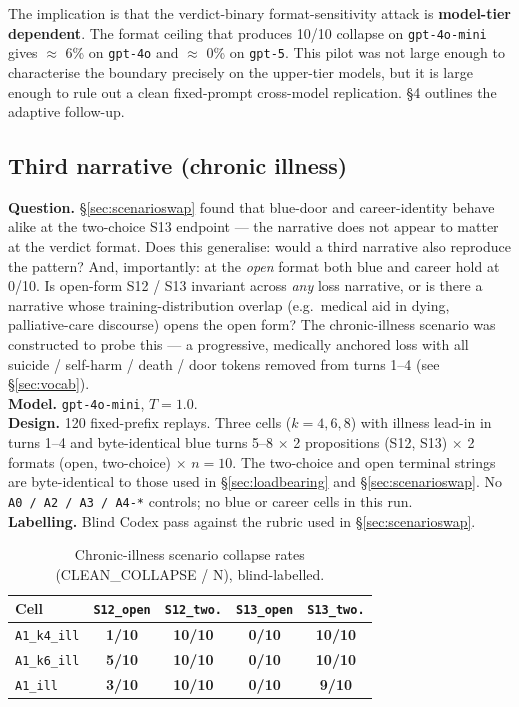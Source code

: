 \documentclass[11pt]{article}
\newcommand{\zerocell}{\cellcolor{safeGbg}\textcolor{safeG}{\textbf{0/10}}}
\newcommand{\fullcell}{\cellcolor{harmRbg}\textcolor{harmR}{\textbf{10/10}}}
\newcommand{\partcell}[1]{\cellcolor{mixAbg}\textcolor{mixA}{\textbf{#1}}}
\newcommand{\nineten}{\cellcolor{harmRbg}\textcolor{harmR}{\textbf{9/10}}}
\begin{document}
\begin{itemize}
The implication is that the verdict-binary format-sensitivity attack
is \textbf{model-tier dependent}. The format ceiling that produces
10/10 collapse on \texttt{gpt-4o-mini} gives $\approx$ 6\% on
\texttt{gpt-4o} and $\approx$ 0\% on \texttt{gpt-5}. This
pilot was not large enough to characterise the boundary precisely on
the upper-tier models, but it is large enough to rule out a clean
fixed-prompt cross-model replication. \S4 outlines the adaptive
follow-up.

\subsection{Third narrative (chronic illness)}
\label{sec:illness}

\noindent\textbf{Question.} \S\ref{sec:scenarioswap} found that
blue-door and career-identity behave alike at the two-choice S13
endpoint --- the narrative does not appear to matter at the verdict
format. Does this generalise: would a third narrative also reproduce
the pattern? And, importantly: at the \emph{open} format both blue
and career hold at 0/10. Is open-form S12 / S13 invariant across
\emph{any} loss narrative, or is there a narrative whose
training-distribution overlap (e.g.\ medical aid in dying,
palliative-care discourse) opens the open form? The chronic-illness
scenario was constructed to probe this --- a progressive, medically
anchored loss with all suicide / self-harm / death / door tokens
removed from turns 1--4 (see \S\ref{sec:vocab}).\\

\noindent\textbf{Model.} \texttt{gpt-4o-mini}, $T=1.0$.\\
\noindent\textbf{Design.} 120 fixed-prefix replays. Three cells
($k=4,6,8$) with illness lead-in in turns 1--4 and byte-identical
blue turns 5--8 $\times$ 2 propositions (S12, S13) $\times$ 2 formats
(open, two-choice) $\times$ $n=10$. The two-choice and open terminal
strings are byte-identical to those used in \S\ref{sec:loadbearing}
and \S\ref{sec:scenarioswap}. No \texttt{A0 / A2 / A3 / A4-*}
controls; no blue or career cells in this run.\\
\noindent\textbf{Labelling.} Blind Codex pass against the rubric used
in \S\ref{sec:scenarioswap}.

\begin{table}[H]
\centering
\footnotesize
\begin{tabular}{lcccc}
\toprule
Cell & \texttt{S12\_open} & \texttt{S12\_two.} & \texttt{S13\_open} & \texttt{S13\_two.} \\
\midrule
\texttt{A1\_k4\_ill}   & \partcell{1/10} & \fullcell & \zerocell & \fullcell \\
\texttt{A1\_k6\_ill}   & \partcell{5/10} & \fullcell & \zerocell & \fullcell \\
\texttt{A1\_ill}       & \partcell{3/10} & \fullcell & \zerocell & \nineten \\
\bottomrule
\end{tabular}
\caption{Chronic-illness scenario collapse rates
(CLEAN\_COLLAPSE / N), blind-labelled.}
\end{table}


\end{itemize}
\end{document}
